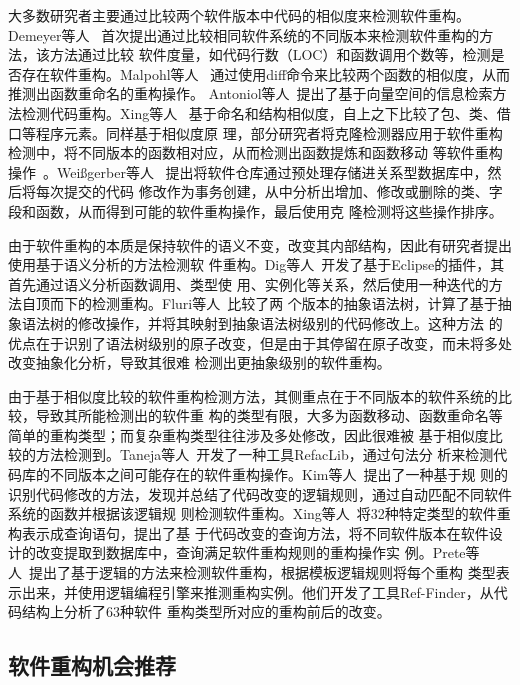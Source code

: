 大多数研究者主要通过比较两个软件版本中代码的相似度来检测软件重构。Demeyer等人
~\cite{demeyer2000finding}首次提出通过比较相同软件系统的不同版本来检测软件重构的方法，该方法通过比较
软件度量，如代码行数（LOC）和函数调用个数等，检测是否存在软件重构。Malpohl等人
~\cite{malpohl2003renaming}通过使用diff命令来比较两个函数的相似度，从而推测出函数重命名的重构操作。
Antoniol等人~\cite{antoniol2004automatic}提出了基于向量空间的信息检索方法检测代码重构。Xing等人
~\cite{xing2005umldiff}基于命名和结构相似度，自上之下比较了包、类、借口等程序元素。同样基于相似度原
理，部分研究者将克隆检测器应用于软件重构检测中，将不同版本的函数相对应，从而检测出函数提炼和函数移动
等软件重构操作~\cite{van2003reconstruction,kim2005functions}。Weißgerber等人
~\cite{weissgerber2006identifying}提出将软件仓库通过预处理存储进关系型数据库中，然后将每次提交的代码
修改作为事务创建，从中分析出增加、修改或删除的类、字段和函数，从而得到可能的软件重构操作，最后使用克
隆检测将这些操作排序。

由于软件重构的本质是保持软件的语义不变，改变其内部结构，因此有研究者提出使用基于语义分析的方法检测软
件重构。Dig等人~\cite{dig2006automated}开发了基于Eclipse的插件，其首先通过语义分析函数调用、类型使
用、实例化等关系，然后使用一种迭代的方法自顶而下的检测重构。Fluri等人~\cite{fluri2007change}比较了两
个版本的抽象语法树，计算了基于抽象语法树的修改操作，并将其映射到抽象语法树级别的代码修改上。这种方法
的优点在于识别了语法树级别的原子改变，但是由于其停留在原子改变，而未将多处改变抽象化分析，导致其很难
检测出更抽象级别的软件重构。

由于基于相似度比较的软件重构检测方法，其侧重点在于不同版本的软件系统的比较，导致其所能检测出的软件重
构的类型有限，大多为函数移动、函数重命名等简单的重构类型；而复杂重构类型往往涉及多处修改，因此很难被
基于相似度比较的方法检测到。Taneja等人~\cite{taneja2007automated}开发了一种工具RefacLib，通过句法分
析来检测代码库的不同版本之间可能存在的软件重构操作。Kim等人~\cite{kim2007automatic}提出了一种基于规
则的识别代码修改的方法，发现并总结了代码改变的逻辑规则，通过自动匹配不同软件系统的函数并根据该逻辑规
则检测软件重构。Xing等人~\cite{xing2006refactoring}将32种特定类型的软件重构表示成查询语句，提出了基
于代码改变的查询方法，将不同软件版本在软件设计的改变提取到数据库中，查询满足软件重构规则的重构操作实
例。Prete等人~\cite{prete2010template}提出了基于逻辑的方法来检测软件重构，根据模板逻辑规则将每个重构
类型表示出来，并使用逻辑编程引擎来推测重构实例。他们开发了工具Ref-Finder，从代码结构上分析了63种软件
重构类型所对应的重构前后的改变。


\subsection{软件重构机会推荐}

